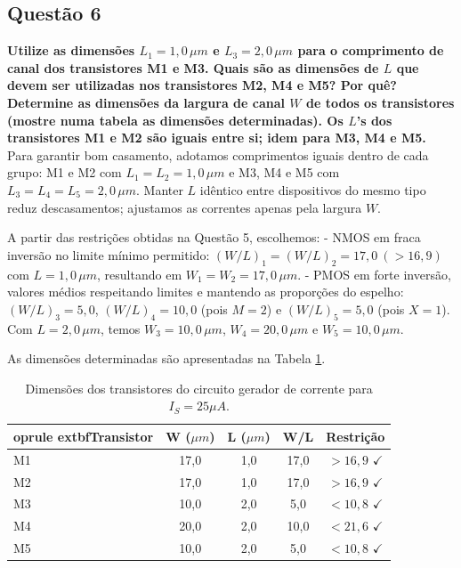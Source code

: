 ﻿\documentclass[12pt,a4paper]{article}
\begin{document}
\subsection*{Questão 6}
    	\textbf{Utilize as dimensões $L_1 = 1{,}0\,\mu m$ e $L_3 = 2{,}0\,\mu m$ para o comprimento de canal dos transistores M1 e M3. Quais são as dimensões de $L$ que devem ser utilizadas nos transistores M2, M4 e M5? Por quê? Determine as dimensões da largura de canal $W$ de todos os transistores (mostre numa tabela as dimensões determinadas). Os $L$’s dos transistores M1 e M2 são iguais entre si; idem para M3, M4 e M5.}\\


Para garantir bom casamento, adotamos comprimentos iguais dentro de cada grupo: M1 e M2 com $L_1=L_2=1{,}0\,\mu m$ e M3, M4 e M5 com $L_3=L_4=L_5=2{,}0\,\mu m$. Manter $L$ idêntico entre dispositivos do mesmo tipo reduz descasamentos; ajustamos as correntes apenas pela largura $W$.

A partir das restrições obtidas na Questão 5, escolhemos:
- NMOS em fraca inversão no limite mínimo permitido: $(W/L)_1 = (W/L)_2 = 17{,}0\ (>16{,}9)$ com $L=1{,}0\,\mu m$, resultando em $W_1=W_2=17{,}0\,\mu m$.
- PMOS em forte inversão, valores médios respeitando limites e mantendo as proporções do espelho: $(W/L)_3 = 5{,}0$, $(W/L)_4 = 10{,}0$ (pois $M=2$) e $(W/L)_5 = 5{,}0$ (pois $X=1$). Com $L=2{,}0\,\mu m$, temos $W_3=10{,}0\,\mu m$, $W_4=20{,}0\,\mu m$ e $W_5=10{,}0\,\mu m$.

As dimensões determinadas são apresentadas na Tabela \ref{tab:dimensoes}.

\begin{table}[H]
\centering
\caption{Dimensões dos transistores do circuito gerador de corrente para $I_S = 25\mu A$.}
\label{tab:dimensoes}
\begin{tabular}{@{}lcccc@{}}
	oprule
	extbf{Transistor} & \textbf{W ($\mu m$)} & \textbf{L ($\mu m$)} & \textbf{W/L} & \textbf{Restrição} \\ \midrule
M1 & 17,0 & 1,0 & 17,0 & $> 16,9$ $\checkmark$ \\
M2 & 17,0 & 1,0 & 17,0 & $> 16,9$ $\checkmark$ \\
M3 & 10,0 & 2,0 & 5,0 & $< 10,8$ $\checkmark$ \\
M4 & 20,0 & 2,0 & 10,0 & $< 21,6$ $\checkmark$ \\
M5 & 10,0 & 2,0 & 5,0 & $< 10,8$ $\checkmark$ \\
\bottomrule
\end{tabular}
\end{table}
\end{document}
